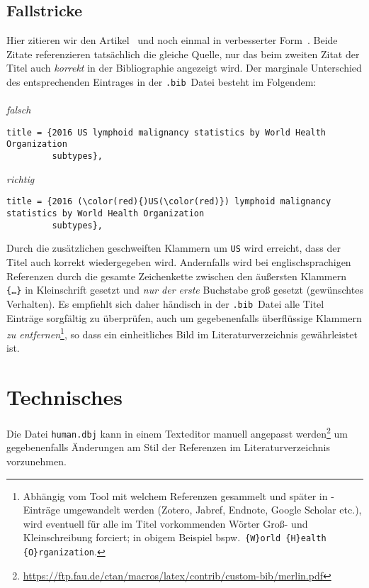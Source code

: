 \documentclass[a4paper,10pt]{scrartcl}
\renewcommand{\cite}{\citep}  %
\begin{document}
\subsection{Fallstricke}
Hier zitieren wir den Artikel~\cite{teras2016_FALSCH} und noch einmal in
verbesserter Form~\cite{teras2016_RICHTIG}. Beide Zitate referenzieren
tats\"achlich die gleiche Quelle, nur das beim zweiten Zitat der
Titel auch \emph{korrekt} in der Bibliographie angezeigt wird. Der
marginale Unterschied des entsprechenden Eintrages
in der \verb|.bib|~Datei besteht im Folgendem:\\\\
\emph{falsch}
\begin{Verbatim}
title = {2016 US lymphoid malignancy statistics by World Health Organization
         subtypes},
\end{Verbatim}
\emph{richtig}
\begin{Verbatim}[commandchars=\\\(\)]
title = {2016 (\color(red){)US(\color(red)}) lymphoid malignancy statistics by World Health Organization
         subtypes},
\end{Verbatim}
Durch die zusätzlichen geschweiften Klammern um \texttt{US} wird erreicht, dass der Titel
auch korrekt wiedergegeben wird. Andernfalls wird bei englischsprachigen
Referenzen durch  die gesamte Zeichenkette zwischen den
\"au{\ss}ersten Klammern \texttt{\{\ldots \}} in Kleinschrift gesetzt und
\emph{nur der erste} Buchstabe gro{\ss} gesetzt (gewünschtes Verhalten). Es empfiehlt sich daher händisch in
der
\verb|.bib|~Datei alle Titel Einträge sorgfältig zu überprüfen, auch um
gegebenenfalls überflüssige Klammern \emph{zu entfernen}\footnote{Abhängig vom
Tool mit welchem Referenzen gesammelt und später in -Einträge
umgewandelt werden (Zotero, Jabref, Endnote, Google Scholar etc.), wird
eventuell für alle im Titel vorkommenden Wörter
Gro{\ss}- und Kleinschreibung forciert; in obigem Beispiel bspw.\ \verb|{W}orld {H}ealth {O}rganization|.},
so dass ein einheitliches Bild im Literaturverzeichnis gewährleistet ist.

\section{Technisches}
Die Datei \verb|human.dbj| kann in einem Texteditor manuell angepasst
werden\footnote{%
\url{https://ftp.fau.de/ctan/macros/latex/contrib/custom-bib/merlin.pdf}} um
gegebenenfalls Änderungen am Stil der Referenzen im Literaturverzeichnis
vorzunehmen.
\end{document}
